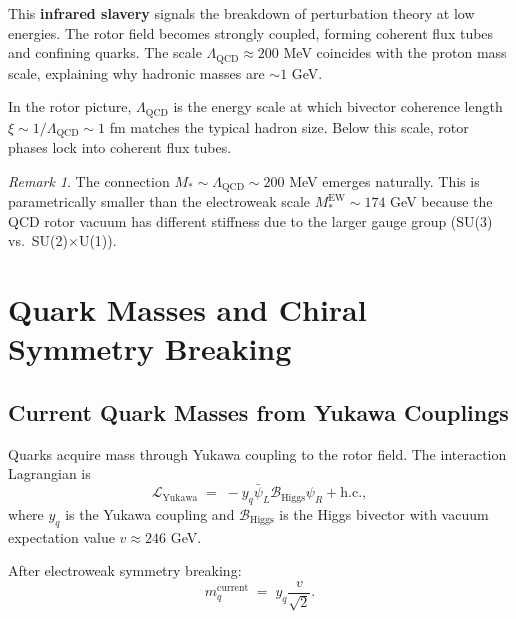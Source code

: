 \documentclass[11pt,a4paper]{article}
\newcommand{\Biv}{\mathcal{B}}
\newcommand{\Lag}{\mathcal{L}}
\theoremstyle{definition}
\theoremstyle{plain}
\theoremstyle{remark}
\newtheorem{remark}{Remark}[section]
\begin{document}
This \textbf{infrared slavery} signals the breakdown of perturbation theory at low energies. The rotor field becomes strongly coupled, forming coherent flux tubes and confining quarks. The scale $\Lambda_{\mathrm{QCD}} \approx 200$ MeV coincides with the proton mass scale, explaining why hadronic masses are $\sim 1$ GeV.

In the rotor picture, $\Lambda_{\mathrm{QCD}}$ is the energy scale at which bivector coherence length $\xi \sim 1/\Lambda_{\mathrm{QCD}} \sim 1$ fm matches the typical hadron size. Below this scale, rotor phases lock into coherent flux tubes.

\begin{remark}
The connection $M_\ast \sim \Lambda_{\mathrm{QCD}} \sim 200$ MeV emerges naturally. This is parametrically smaller than the electroweak scale $M_\ast^{\mathrm{EW}} \sim 174$ GeV because the QCD rotor vacuum has different stiffness due to the larger gauge group (SU(3) vs.\ SU(2)$\times$U(1)).
\end{remark}

\vspace{1em}

\section{Quark Masses and Chiral Symmetry Breaking}
\label{sec:quark-masses}

\subsection{Current Quark Masses from Yukawa Couplings}

Quarks acquire mass through Yukawa coupling to the rotor field. The interaction Lagrangian is
\begin{equation}
\Lag_{\mathrm{Yukawa}} \;=\; -y_q \bar{\psi}_L \Biv_{\mathrm{Higgs}} \psi_R + \text{h.c.},
\label{eq:quark-yukawa}
\end{equation}
where $y_q$ is the Yukawa coupling and $\Biv_{\mathrm{Higgs}}$ is the Higgs bivector with vacuum expectation value $v \approx 246$ GeV.

After electroweak symmetry breaking:
\begin{equation}
m_q^{\mathrm{current}} \;=\; y_q \frac{v}{\sqrt{2}}.
\label{eq:current-mass}
\end{equation}
\end{document}
